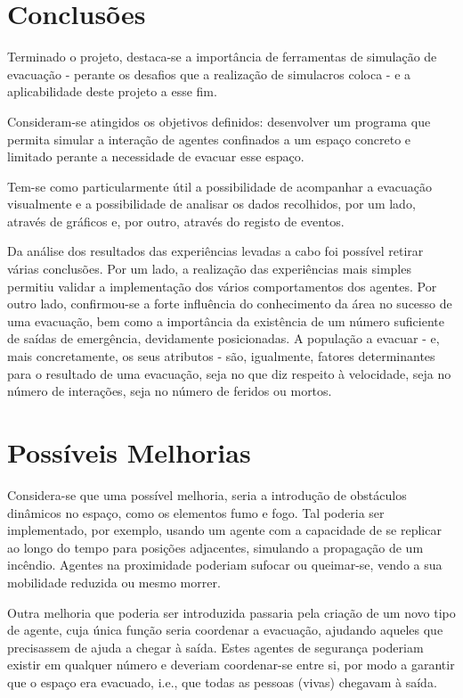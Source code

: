 \documentclass[12pt]{article}
\begin{document}
\begin{titlepage}
\begin{itemize}
\end{itemize}
	
	

\newpage
\section{Conclusões}

Terminado o projeto, destaca-se a importância de ferramentas de simulação de evacuação - perante os desafios que a realização de simulacros coloca - e a aplicabilidade deste projeto a esse fim.

Consideram-se atingidos os objetivos definidos: desenvolver um programa que permita simular a interação de agentes confinados a um espaço concreto e limitado perante a necessidade de evacuar esse espaço.

Tem-se como particularmente útil a possibilidade de acompanhar a evacuação visualmente e a possibilidade de analisar os dados recolhidos, por um lado, através de gráficos e, por outro, através do registo de eventos.

Da análise dos resultados das experiências levadas a cabo foi possível retirar várias conclusões. Por um lado, a realização das experiências mais simples permitiu validar a implementação dos vários comportamentos dos agentes.
Por outro lado, confirmou-se a forte influência do conhecimento da área no sucesso de uma evacuação, bem como a importância da existência de um número suficiente de saídas de emergência, devidamente posicionadas. A população a evacuar - e, mais concretamente, os seus atributos - são, igualmente, fatores determinantes para o resultado de uma evacuação, seja no que diz respeito à velocidade, seja no número de interações, seja no número de feridos ou mortos.

\section{Possíveis Melhorias}

Considera-se que uma possível melhoria, seria a introdução de obstáculos dinâmicos no espaço, como os elementos fumo e fogo. Tal poderia ser implementado, por exemplo, usando um agente com a capacidade de se replicar ao longo do tempo para posições adjacentes, simulando a propagação de um incêndio. Agentes na proximidade poderiam sufocar ou queimar-se, vendo a sua mobilidade reduzida ou mesmo morrer.

Outra melhoria que poderia ser introduzida passaria pela criação de um novo tipo de agente, cuja única função seria coordenar a evacuação, ajudando aqueles que precisassem de ajuda a chegar à saída. Estes agentes de segurança poderiam existir em qualquer número e deveriam coordenar-se entre si, por modo a garantir que o espaço era evacuado, i.e., que todas as pessoas (vivas) chegavam à saída.




\end{titlepage}
\end{document}

